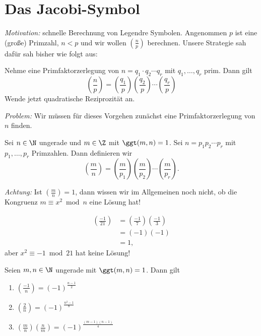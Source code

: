 \section{Das Jacobi-Symbol}\addtocounter{video}{1}

\emph{Motivation:} schnelle Berechnung von Legendre Symbolen. Angenommen $p$ ist eine (große) Primzahl, $n < p$ und wir wollen $\left(\frac{n}{p}\right)$ berechnen. Unsere Strategie sah dafür sah bisher wie folgt aus:\video{}

Nehme eine Primfaktorzerlegung von $n = q_1 \cdot q_2 \dotsm q_r$ mit $q_1,\dotsc,q_r$ prim. Dann gilt
\[ \left(\frac{n}{p}\right) = \left(\frac{q_1}{p}\right) \left(\frac{q_2}{p}\right) \dotsm \left(\frac{q_r}{p}\right) \]
Wende jetzt quadratische Reziprozität an.

\emph{Problem:} Wir müssen für dieses Vorgehen zunächst eine Primfaktorzerlegung von $n$ finden.

\begin{defn*}
	Sei $n \in \N$ ungerade und $m \in \Z$ mit $\ggt(m,n)=1$. Sei $n = p_1 p_2 \dotsm p_r$ mit $p_1,\dotsc, p_r$ Primzahlen. Dann definieren wir
	\[ \left(\frac{m}{n}\right) = \left(\frac{m}{p_1}\right) \left(\frac{m}{p_2}\right) \dotsm \left(\frac{m}{p_r}\right). \]
\end{defn*}

\emph{Achtung:} Ist $\left(\frac{m}{n}\right)=1$, dann wissen wir im Allgemeinen noch nicht, ob die Kongruenz $m \equiv x^2 \bmod n$ eine Lösung hat!

\begin{exmp*}
	\begin{align*}
		\left(\frac{-1}{21}\right) &= \left(\frac{-1}{7}\right) \left(\frac{-1}{3}\right)\\
		&= (-1)(-1)\\
		&=1,
	\end{align*}
	aber $x^2 \equiv -1 \bmod 21$ hat keine Lösung!
\end{exmp*}

\begin{thm}\autolabel
	Seien $m,n \in \N$ ungerade mit $\ggt(m,n)=1$. Dann gilt
	\begin{enumerate}[label={\roman*})]
		\item $\left(\frac{-1}{n}\right) = (-1)^\frac{n-1}{2}$
		\item \( \left(\frac{2}{n}\right) = (-1)^\frac{n^2-1}{8} \)
		\item \( \left(\frac{m}{n}\right) \left(\frac{n}{m}\right) = (-1)^\frac{(m-1)(n-1)}{4} \)
	\end{enumerate}
\end{thm}